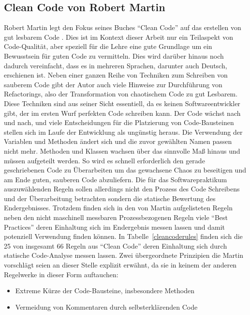 \documentclass[da,ngerman]{stthesis}
\begin{document}
			\subsection{Clean Code von Robert Martin}
				Robert Martin legt den Fokus seines Buches "`Clean Code"' auf das erstellen von gut lesbarem Code \cite{CleanCode}. Dies ist im Kontext dieser Arbeit nur ein Teilaspekt von Code-Qualität, aber speziell für die Lehre eine gute Grundlage um ein Bewusstsein für guten Code zu vermitteln. Dies wird darüber hinaus noch dadurch vereinfacht, dass es in mehreren Sprachen, darunter auch Deutsch, erschienen ist. \newline
				Neben einer ganzen Reihe von Techniken zum Schreiben von sauberem Code gibt der Autor auch viele Hinweise zur Durchführung von Refactorings, also der Transformation von chaotischem Code zu gut Lesbarem. Diese Techniken sind aus seiner Sicht essentiell, da es keinen Softwareentwickler gibt, der im ersten Wurf perfekten Code schreiben kann. Der Code wächst nach und nach, und viele Entscheidungen für die Platzierung von Code-Bausteinen stellen sich im Laufe der Entwicklung als ungünstig heraus. Die Verwendung der Variablen und Methoden ändert sich und die zuvor gewählten Namen passen nicht mehr. Methoden und Klassen wachsen über das sinnvolle Maß hinaus und müssen aufgeteilt werden. So wird es schnell erforderlich den gerade geschriebenen Code zu Überarbeiten um das gewachsene Chaos zu beseitigen und am Ende guten, sauberen Code abzuliefern. \newline
				Die für das Softwarepraktikum auszuwählenden Regeln sollen allerdings nicht den Prozess des Code Schreibens und der Überarbeitung betrachten sondern die statische Bewertung des Endergebnisses. Trotzdem finden sich in den von Martin aufgelisteten Regeln neben den nicht maschinell messbaren Prozessbezogenen Regeln viele "`Best Practices"' deren Einhaltung sich im Endergebnis messen lassen und damit potenziell Verwendung finden können. In Tabelle~\ref{cleancoderules} finden sich die 25 von insgesamt 66 Regeln aus "`Clean Code"' deren Einhaltung sich durch statische Code-Analyse messen lassen. \newline
				Zwei übergeordnete Prinzipien die Martin vorschlägt seien an dieser Stelle explizit erwähnt, da sie in keinem der anderen Regelwerke in dieser Form auftauchen:
				\begin{itemize}
					\item Extreme Kürze der Code-Bausteine, insbesondere Methoden  
					\item Vermeidung von Kommentaren durch selbsterklärenden Code
				\end{itemize}
\end{document}
